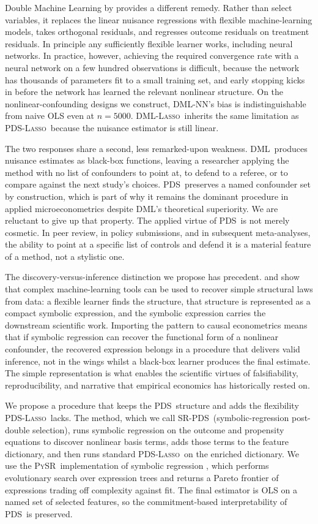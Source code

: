 \documentclass[11pt, a4paper]{article}
\theoremstyle{plain}
\theoremstyle{definition}
\theoremstyle{remark}
\newcommand{\lasso}{\textsc{Lasso}}
\newcommand{\pds}{\textsc{PDS}}
\newcommand{\dml}{\textsc{DML}}
\newcommand{\pysr}{\textsc{PySR}}
\newcommand{\epds}{\textsc{SR-PDS}}
\begin{document}
Double Machine Learning by \citet{chernozhukov2018} provides a
different remedy. Rather than select variables, it replaces the
linear nuisance regressions with flexible machine-learning models,
takes orthogonal residuals, and regresses outcome residuals on
treatment residuals. In principle any sufficiently flexible learner
works, including neural networks. In practice, however, achieving
the required convergence rate with a neural network on a few
hundred observations is difficult, because the network has
thousands of parameters fit to a small training set, and early
stopping kicks in before the network has learned the relevant
nonlinear structure.
On the nonlinear-confounding designs we construct, \dml-NN's bias
is indistinguishable from naive OLS even at $n=5000$. \dml-\lasso\
inherits the same limitation as \pds-\lasso\ because the nuisance
estimator is still linear.

The two responses share a second, less remarked-upon weakness.
\dml\ produces nuisance estimates as black-box functions, leaving
a researcher applying the method with no list of confounders to
point at, to defend to a referee, or to compare against the next
study's choices. \pds\ preserves a named confounder set by construction,
which is part of why it remains the dominant procedure in applied
microeconometrics despite \dml's theoretical superiority. We are
reluctant to give up that property. The applied virtue of \pds\ is
not merely cosmetic. In peer review, in policy submissions, and in
subsequent meta-analyses, the ability to point at a specific list
of controls and defend it is a material feature of a method, not a
stylistic one.

The discovery-versus-inference distinction we propose has
precedent. \citet{schmidt2009gp} and \citet{cranmer2020} show
that complex machine-learning tools can be used to recover
simple structural laws from data: a flexible learner finds the
structure, that structure is represented as a compact symbolic
expression, and the symbolic expression carries the downstream
scientific work. Importing the pattern to causal econometrics
means that if symbolic regression can recover the functional
form of a nonlinear confounder, the recovered expression
belongs in a procedure that delivers valid inference, not in
the wings whilst a black-box learner produces the final
estimate. The simple representation is what enables the
scientific virtues of falsifiability, reproducibility, and
narrative that empirical economics has historically rested on.

We propose a procedure that keeps the \pds\ structure and adds the
flexibility \pds-\lasso\ lacks. The method, which we call \epds\
(symbolic-regression post-double selection), runs symbolic
regression on the
outcome and propensity equations to discover nonlinear basis terms,
adds those terms to the feature dictionary, and then runs standard
\pds-\lasso\ on the enriched dictionary. We use the \pysr\
implementation of symbolic regression \citep{cranmer2023pysr},
which performs evolutionary search over expression trees and
returns a Pareto frontier of expressions trading off complexity
against fit. The final estimator is OLS on a named set of selected
features, so the commitment-based interpretability of \pds\ is
preserved.
\end{document}
